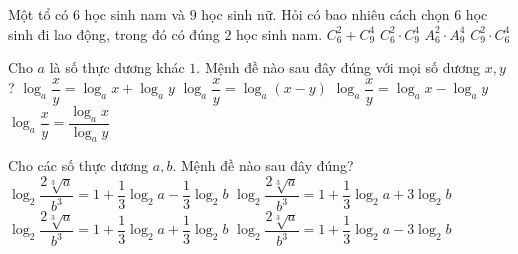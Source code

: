 \begin{ex}%
	Một tổ có $6$ học sinh nam và $9$ học sinh nữ. Hỏi có bao nhiêu cách chọn $6$ học sinh đi lao động, trong đó có đúng $2$ học sinh nam.
	\choice
	{$C_6^2+C_9^4$}
	{\True $C_6^2 \cdot C_9^4$}
	{ $A_6^2 \cdot A_9^4$}
	{ $C_9^2 \cdot C_6^4$}
\end{ex}

\begin{ex}%
	Cho $a$ là số thực dương khác $1$. Mệnh đề nào sau đây đúng với mọi số dương $x,y$?
	\choice
	{$\log_a \dfrac{x}{y}=\log_a x+\log_ay$}
	{$\log_a \dfrac{x}{y}=\log_a(x-y)$}
	{ \True $\log_a \dfrac{x}{y}=\log_a x -\log_a y$}
	{ $\log_a \dfrac{x}{y}= \dfrac{\log_a x}{\log_a y}$}
\end{ex}
\begin{ex}%
	Cho các số thực dương $a,b$. Mệnh đề nào sau đây đúng?
	\choice
	{$\log_2 {\dfrac{2\sqrt[3]{a}}{b^3}}=1+\dfrac{1}{3}\log_2 a -\dfrac{1}{3}\log_2 b$}
	{$\log_2 {\dfrac{2\sqrt[3]{a}}{b^3}}=1+\dfrac{1}{3}\log_2 a +3\log_2 b$}
	{  $\log_2 {\dfrac{2\sqrt[3]{a}}{b^3}}=1+\dfrac{1}{3}\log_2 a +\dfrac{1}{3}\log_2 b$}
	{\True $\log_2 {\dfrac{2\sqrt[3]{a}}{b^3}}=1+\dfrac{1}{3}\log_2 a -3\log_2 b$}
\end{ex}


